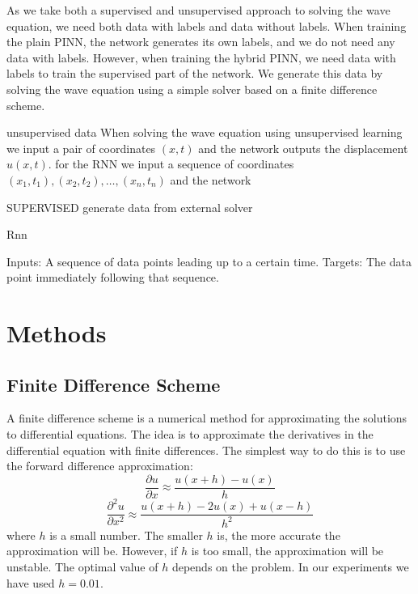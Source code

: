 \documentclass[twoside,11pt]{report}
\begin{document}
    As we take both a supervised and unsupervised approach to solving the wave equation, we need both
    data with labels and data without labels. When training the plain PINN, the network generates its own
    labels, and we do not need any data with labels. However, when training the hybrid PINN, we need data
    with labels to train the supervised part of the network. We generate this data by solving the wave
    equation using a simple solver based on a finite difference scheme. 
    
    unsupervised data 
    When solving the wave equation using unsupervised learning we 
    input a pair of coordinates $(x,t)$ and the network outputs the displacement $u(x,t)$.
    for the RNN we input a sequence of coordinates $(x_1,t_1), (x_2,t_2), \dots, (x_n,t_n)$ and the network

    SUPERVISED
    generate data from external solver


    Rnn

    Inputs: A sequence of data points leading up to a certain time.
    Targets: The data point immediately following that sequence.

\section{Methods}
\label{sec:methods}
   




\subsection{Finite Difference Scheme}
\label{sec:finite}

    A finite difference scheme is a numerical method for approximating the solutions to differential equations.
    The idea is to approximate the derivatives in the differential equation with finite differences.
    The simplest way to do this is to use the forward difference approximation:
    \begin{equation}
    \frac{\partial u}{\partial x} \approx \frac{u(x+h) - u(x)}{h}
    \end{equation}
    \begin{equation}
    \frac{\partial^2 u}{\partial x^2} \approx \frac{u(x+h) - 2u(x) + u(x-h)}{h^2}
    \end{equation}
    where $h$ is a small number. The smaller $h$ is, the more accurate the approximation will be.
    However, if $h$ is too small, the approximation will be unstable. The optimal value of $h$ depends
    on the problem. In our experiments we have used $h=0.01$.
\end{document}
